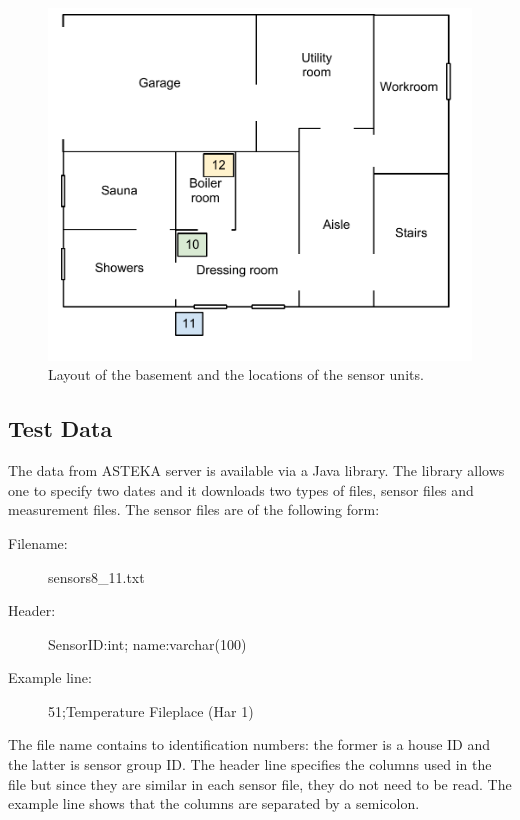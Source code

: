 \begin{figure}[here]
\centering
\includegraphics[scale=0.7]{images/kellari.pdf}
\caption{Layout of the basement and the locations of the sensor units.}
\label{fig:basement}
\end{figure}



\subsection{Test Data}
The data from ASTEKA server is available via a Java library. The library allows one to specify two dates and it downloads two types of files, sensor files and measurement files. The sensor files are of the following form:

\begin{description}
\item[Filename:]{sensors8\_11.txt}
\item[Header:]{SensorID:int; name:varchar(100)}
\item[Example line:]{51;Temperature Fileplace (Har 1)}
\end{description}

The file name contains to identification numbers: the former is a house ID and the latter is sensor group ID. The header line specifies the columns used in the file but since they are similar in each sensor file, they do not need to be read. The example line shows that the columns are separated by a semicolon.

